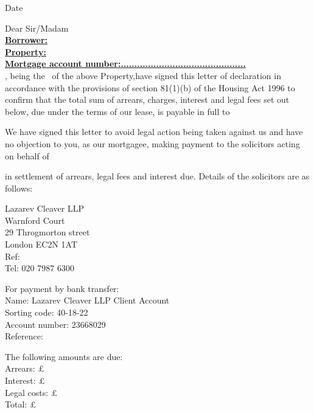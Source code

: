\documentclass{article}
\begin{document}
\noindent{\addressee} \\
\street\\
\locality\\
\town\\
\postcode\\

\noindent Date \dateset\par
\vspace{5 mm}
\noindent Dear Sir/Madam\\
\textbf{\underline{Borrower: \borrower}}\\
\noindent\textbf{\underline{Property: \property}}
\vspace{2 mm}\\
\textbf{\underline{Mortgage account number:..............................................}}\\
\weborrower, being the \lessees\ of the above Property,have signed this letter of declaration in accordance with the provisions of section 81(1)(b) of the Housing Act 1996 to confirm that the total sum of arrears, charges, interest and legal fees set out below, due under the terms of our lease, is payable in full to \address. We have signed this letter to avoid legal action being taken against
us and have no objection to you, as our mortgagee, making payment to the solicitors acting
on behalf of \address\ in settlement of arrears, legal fees and interest due. Details of the solicitors are as follows:

\begin{multicols}{2}
\noindent Lazarev Cleaver LLP\\
Warnford Court\\
29 Throgmorton street\\
London EC2N 1AT\\
Ref: \caseno\\
Tel: 020 7987 6300

\columnbreak
\vspace{4 mm}
\noindent For payment by bank transfer:\\
Name: Lazarev Cleaver LLP Client Account\\
Sorting code: 40-18-22\\
Account number: 23668029\\
Reference: \caseno
\vspace{4 mm}
\end{multicols}
\par
\noindent The following amounts are due:\\
\indent Arrears: £\arrears\\
\indent Interest: £\interest\\
\indent Legal costs: £\legalcosts\\
\indent Total: £\total
\end{document}
